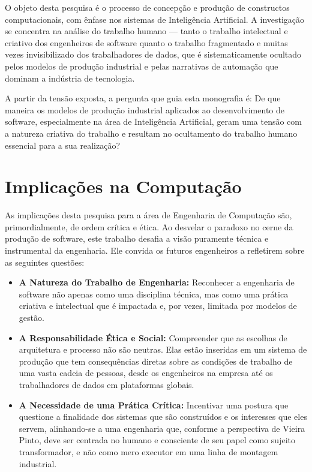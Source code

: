 O objeto desta pesquisa é o processo de concepção e produção de constructos computacionais, com ênfase nos sistemas de Inteligência Artificial. A investigação se concentra na 
análise do trabalho humano — tanto o trabalho intelectual e criativo dos engenheiros de software quanto o trabalho fragmentado e muitas vezes invisibilizado dos trabalhadores 
de dados, que é sistematicamente ocultado pelos modelos de produção industrial e pelas narrativas de automação que dominam a indústria de tecnologia.

A partir da tensão exposta, a pergunta que guia esta monografia é: De que maneira os modelos de produção industrial aplicados ao desenvolvimento de software, especialmente na 
área de Inteligência Artificial, geram uma tensão com a natureza criativa do trabalho e resultam no ocultamento do trabalho humano essencial para a sua realização?

\section{Implicações na Computação}\label{sec:implicacoes_computacao}

As implicações desta pesquisa para a área de Engenharia de Computação são, primordialmente, de ordem crítica e ética. Ao desvelar o paradoxo no cerne da produção de software, 
este trabalho desafia a visão puramente técnica e instrumental da engenharia. Ele convida os futuros engenheiros a refletirem sobre as seguintes questões:

\begin{itemize}
    \item \textbf{A Natureza do Trabalho de Engenharia:} Reconhecer a engenharia de software não apenas como uma disciplina técnica, mas como uma prática criativa e intelectual que é impactada e, 
por vezes, limitada por modelos de gestão.

    \item \textbf{A Responsabilidade Ética e Social:} Compreender que as escolhas de arquitetura e processo não são neutras. Elas estão inseridas em um sistema de produção que tem consequências 
diretas sobre as condições de trabalho de uma vasta cadeia de pessoas, desde os engenheiros na empresa até os trabalhadores de dados em plataformas globais.

    \item \textbf{A Necessidade de uma Prática Crítica:} Incentivar uma postura que questione a finalidade dos sistemas que são construídos e os interesses que eles servem, alinhando-se a uma 
engenharia que, conforme a perspectiva de Vieira Pinto, deve ser centrada no humano e consciente de seu papel como sujeito transformador, e não como mero executor em uma linha 
de montagem industrial. 
\end{itemize}
